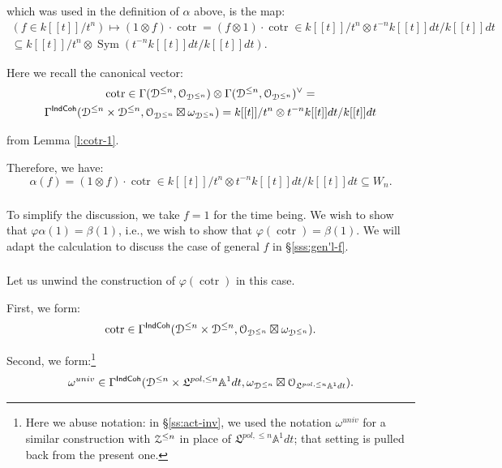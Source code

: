 \documentclass[reqno,11pt]{amsart}
\numberwithin{equation}{subsection}
\theoremstyle{remark}
\newcommand{\bA}{{\mathbb A}}
\newcommand{\sD}{{\EuScript D}}
\newcommand{\sO}{{\EuScript O}}
\newcommand{\sZ}{{\EuScript Z}}
\newcommand{\fL}{{\mathfrak L}}
\newcommand{\on}{\operatorname}
\newcommand{\cotr}{\on{cotr}}
\newcommand{\vph}{\varphi}
\newcommand{\Sym}{\on{Sym}}
\newcommand{\IndCoh}{\mathsf{IndCoh}}
\renewcommand{\subset}{\subseteq}
\begin{document}
\noindent which was used in the definition of $\alpha$ above,
is the map:
%
\[
\begin{gathered}
(f \in k[[t]]/t^n) \mapsto (1 \otimes f) \cdot \cotr = (f \otimes 1) \cdot \cotr
\in k[[t]]/t^n \otimes t^{-n}k[[t]]dt/k[[t]]dt \\ \subset 
k[[t]]/t^n \otimes \Sym(t^{-n}k[[t]]dt/k[[t]]dt).
\end{gathered}
\]

\noindent Here we recall the canonical vector:
%
\[
\begin{gathered}
\cotr \in 
\Gamma(\sD^{\leq n},\sO_{\sD^{\leq n}}) \otimes
\Gamma(\sD^{\leq n},\sO_{\sD^{\leq n}})^{\vee} = \\
\Gamma^{\IndCoh}(\sD^{\leq n} \times \sD^{\leq n},
\sO_{\sD^{\leq n}} \boxtimes \omega_{\sD^{\leq n}}) = 
k[[t]]/t^n \otimes t^{-n}k[[t]]dt/k[[t]]dt
\end{gathered}
\]

\noindent from Lemma \ref{l:cotr-1}.

Therefore, we have:
%
\[
\alpha(f) = (1 \otimes f) \cdot \cotr \in 
k[[t]]/t^n \otimes t^{-n}k[[t]]dt/k[[t]]dt \subset W_n.
\]

\subsubsection{}

To simplify the discussion, we take $f = 1$ for the time being. 
We wish to show that $\vph\alpha(1) = \beta(1)$, i.e., we wish 
to show that $\vph(\cotr) = \beta(1)$.
We will adapt the calculation to discuss the
case of general $f$ in \S \ref{sss:gen'l-f}.

\subsubsection{}

Let us unwind the construction of $\vph(\cotr)$ in this case.

First, we form:
%
\[
\cotr \in \Gamma^{\IndCoh}(\sD^{\leq n} \times \sD^{\leq n},
\sO_{\sD^{\leq n}} \boxtimes \omega_{\sD^{\leq n}}).
\]

\noindent Second, we form:\footnote{Here we abuse notation: in \S \ref{ss:act-inv}, we used the
notation $\omega^{univ}$ for a similar construction with $\sZ^{\leq n}$ in place of
$\fL^{pol,\leq n} \bA^1 dt$; that setting is pulled back from the present
one.}
%
\[
\omega^{univ} \in \Gamma^{\IndCoh}(\sD^{\leq n} \times 
\fL^{pol,\leq n} \bA^1 dt,
\omega_{\sD^{\leq n}} \boxtimes \sO_{\fL^{pol,\leq n} \bA^1 dt}).
\]
\end{document}
